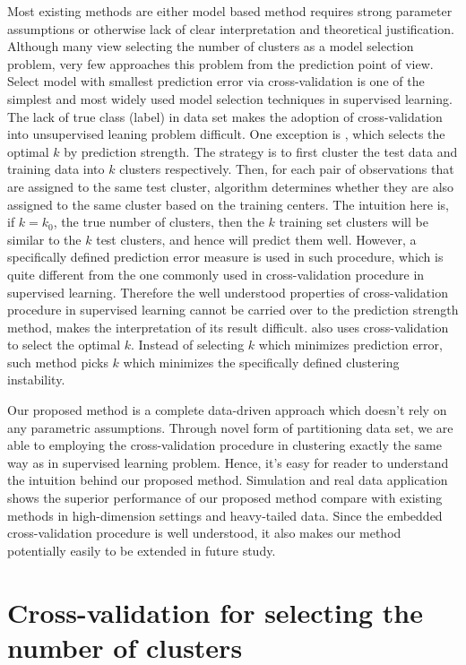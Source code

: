\documentclass[11pt]{article}
\begin{document}
Most existing methods are either model based method requires strong parameter
assumptions or otherwise lack of clear interpretation and theoretical justification.
Although many view selecting the number of clusters as a model selection problem, very few
approaches this problem from the prediction point of view. Select model with
smallest prediction error via cross-validation is one of the simplest and most
widely used model selection techniques in supervised learning. The lack of
true class (label) in data set makes the adoption of cross-validation into
unsupervised leaning problem difficult. One exception is
\cite{tibshirani2005cluster}, which selects the optimal $k$ by prediction
strength. The strategy is to first cluster the test data and training data
into $k$ clusters respectively. Then, for each pair of observations that are
assigned to the same test cluster, algorithm determines whether they are also
assigned to the same cluster based on the training centers. The intuition here
is, if $k=k_0$, the true number of clusters, then the $k$ training set
clusters will be similar to the $k$ test clusters, and hence will predict them
well. However, a specifically defined prediction error measure is used in such
procedure, which is quite different from the one commonly used in
cross-validation procedure in supervised learning. Therefore the well
understood properties of cross-validation procedure in supervised learning
cannot be carried over to the prediction strength method, makes the
interpretation of its result difficult. \citet{wang2010consistent} also uses 
cross-validation to select the optimal $k$. Instead of selecting $k$ which minimizes 
prediction error, such method picks $k$ which minimizes the specifically defined clustering instability.


Our proposed method is a complete data-driven approach which doesn't rely on
any parametric assumptions. Through novel form of partitioning data set, we
are able to employing the cross-validation procedure in clustering exactly the
same way as in supervised learning problem. Hence, it's easy for reader to
understand the intuition behind our proposed method. Simulation and real data
application shows the superior performance of our proposed method compare with
existing methods in high-dimension settings and heavy-tailed data. Since the
embedded cross-validation procedure is well understood, it also makes our
method potentially easily to be extended in future study. 
 


\section{Cross-validation for selecting the number of clusters}
\end{document}
